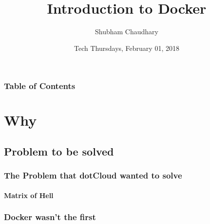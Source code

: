 \documentclass[mathserif,serif]{beamer}
\title[Docker]{Introduction to Docker}
\author[Shubham Chaudhary]{Shubham Chaudhary\inst{1}}
\institute[Zomato Media Pvt.~ Ltd.]{\inst{1} Zomato Media Pvt.~ Ltd.~}
\date[February 2018]{Tech Thursdays, February 01, 2018}
\begin{document}
    \frame{\titlepage}
    \begin{frame}
        \frametitle{Table of Contents}
    \end{frame}

    \section{Why}\label{sec:why}
    \subsection{Problem to be solved}\label{subsec:problemToBeSolved}
    \begin{frame}
        \frametitle{The Problem that dotCloud wanted to solve}
        \framesubtitle{Matrix of Hell}
        \begin{center}
        \end{center}
    \end{frame}

    \begin{frame}
        \frametitle{Docker wasn't the first}
        \begin{center}
        \end{center}
    \end{frame}
\end{document}
